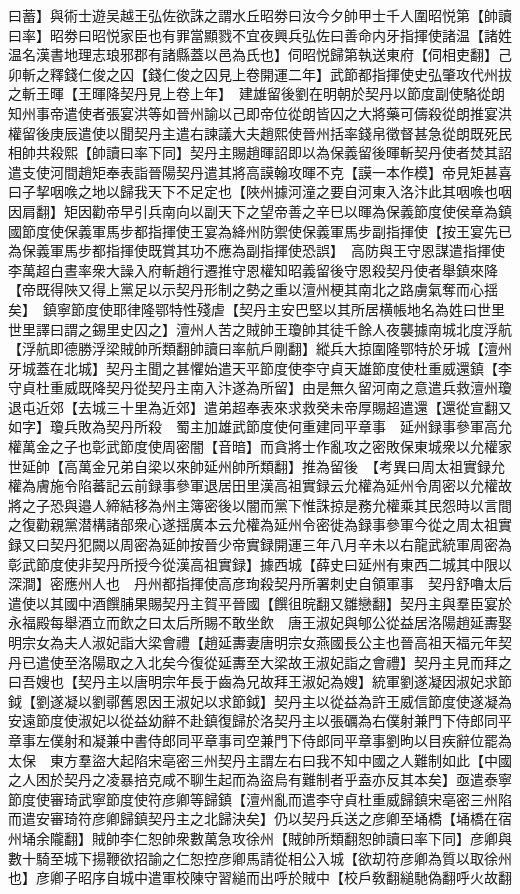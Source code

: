 曰蓄】與術士遊吴越王弘佐欲誅之謂水丘昭劵曰汝今夕帥甲士千人圍昭悦第【帥讀曰率】昭劵曰昭悦家臣也有罪當顯戮不宜夜興兵弘佐曰善命内牙指揮使諸温【諸姓温名漢書地理志琅邪郡有諸縣蓋以邑為氏也】伺昭悦歸第執送東府【伺相吏翻】己卯斬之釋錢仁俊之囚【錢仁俊之囚見上卷開運二年】武節都指揮使史弘肇攻代州拔之斬王暉【王暉降契丹見上卷上年】　建雄留後劉在明朝於契丹以節度副使駱從朗知州事帝遣使者張宴洪等如晉州諭以己即帝位從朗皆囚之大將藥可儔殺從朗推宴洪權留後庚辰遣使以聞契丹主遣右諫議大夫趙熙使晉州括率錢帛徵督甚急從朗既死民相帥共殺熙【帥讀曰率下同】契丹主賜趙暉詔即以為保義留後暉斬契丹使者焚其詔遣支使河間趙矩奉表詣晉陽契丹遣其將高謨翰攻暉不克【謨一本作模】帝見矩甚喜曰子挈咽㗋之地以歸我天下不足定也【陜州據河潼之要自河東入洛汴此其咽㗋也咽因肩翻】矩因勸帝早引兵南向以副天下之望帝善之辛巳以暉為保義節度使侯章為鎮國節度使保義軍馬步都指揮使王宴為絳州防禦使保義軍馬步副指揮使【按王宴先已為保義軍馬步都指揮使既賞其功不應為副指揮使恐誤】　高防與王守恩謀遣指揮使李萬超白晝率衆大譟入府斬趙行遷推守恩權知昭義留後守恩殺契丹使者舉鎮來降【帝既得陜又得上黨足以示契丹形制之勢之重以澶州梗其南北之路虜氣奪而心揺矣】　鎮寧節度使耶律隆鄂特性殘虐【契丹主安巴堅以其所居横帳地名為姓曰世里世里譯曰謂之錫里史囚之】澶州人苦之賊帥王瓊帥其徒千餘人夜襲據南城北度浮航【浮航即德勝浮梁賊帥所類翻帥讀曰率航戶剛翻】縱兵大掠圍隆鄂特於牙城【澶州牙城蓋在北城】契丹主聞之甚懼始遣天平節度使李守貞天雄節度使杜重威還鎮【李守貞杜重威既降契丹從契丹主南入汴遂為所留】由是無久留河南之意遣兵救澶州瓊退屯近郊【去城三十里為近郊】遣弟超奉表來求救癸未帝厚賜超遣還【還從宣翻又如字】瓊兵敗為契丹所殺　蜀主加雄武節度使何重建同平章事　延州録事參軍高允權萬金之子也彰武節度使周密闇【音暗】而貪將士作亂攻之密敗保東城衆以允權家世延帥【高萬金兄弟自梁以來帥延州帥所類翻】推為留後　【考異曰周太祖實録允權為膚施令陷蕃記云前録事參軍退居田里漢高祖實録云允權為延州令周密以允權故將之子恐與邉人締結移為州主簿密後以闇而黨下惟誅掠是務允權乘其民怨時以言間之復勸親黨潜構諸部衆心遂揺廣本云允權為延州令密徙為録事參軍今從之周太祖實録又曰契丹犯闕以周密為延帥按晉少帝實録開運三年八月辛未以右龍武統軍周密為彰武節度使非契丹所授今從漢高祖實録】據西城【薛史曰延州有東西二城其中限以深澗】密應州人也　丹州都指揮使高彦珣殺契丹所署刺史自領軍事　契丹舒嚕太后遣使以其國中酒饌脯果賜契丹主賀平晉國【饌徂晥翻又雛戀翻】契丹主與羣臣宴於永福殿每舉酒立而飲之曰太后所賜不敢坐飲　唐王淑妃與郇公從益居洛陽趙延夀娶明宗女為夫人淑妃詣大梁會禮【趙延夀妻唐明宗女燕國長公主也晉高祖天福元年契丹已遣使至洛陽取之入北矣今復從延夀至大梁故王淑妃詣之會禮】契丹主見而拜之曰吾嫂也【契丹主以唐明宗年長于齒為兄故拜王淑妃為嫂】統軍劉遂凝因淑妃求節鉞【劉遂凝以劉鄩舊恩因王淑妃以求節鉞】契丹主以從益為許王威信節度使遂凝為安遠節度使淑妃以從益幼辭不赴鎮復歸於洛契丹主以張礪為右僕射兼門下侍郎同平章事左僕射和凝兼中書侍郎同平章事司空兼門下侍郎同平章事劉昫以目疾辭位罷為太保　東方羣盜大起陷宋亳密三州契丹主謂左右曰我不知中國之人難制如此【中國之人困於契丹之凌暴掊克咸不聊生起而為盜烏有難制者乎盍亦反其本矣】亟遣泰寧節度使審琦武寧節度使符彦卿等歸鎮【澶州亂而遣李守貞杜重威歸鎮宋亳密三州陷而遣安審琦符彦卿歸鎮契丹主之北歸決矣】仍以契丹兵送之彦卿至埇橋【埇橋在宿州埇余隴翻】賊帥李仁恕帥衆數萬急攻徐州【賊帥所類翻恕帥讀曰率下同】彦卿與數十騎至城下揚鞭欲招諭之仁恕控彦卿馬請從相公入城【欲刧符彦卿為質以取徐州也】彦卿子昭序自城中遣軍校陳守習縋而出呼於賊中【校戶敎翻縋馳偽翻呼火故翻